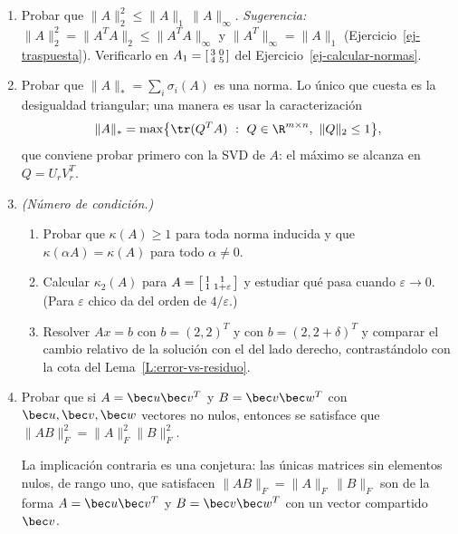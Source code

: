 \begin{enumerate}
\item\label{ej-2-1-infty} Probar que $\|A\|_2^2\le\|A\|_1\,\|A\|_\infty$.
\emph{Sugerencia:} $\|A\|_2^2=\|A^TA\|_2\le\|A^TA\|_\infty$ y
$\|A^T\|_\infty=\|A\|_1$ (Ejercicio~\ref{ej-traspuesta}). Verificarlo en
$A_1=\begin{bsmallmatrix}3&0\\ 4&5\end{bsmallmatrix}$ del
Ejercicio~\ref{ej-calcular-normas}.

\item\label{ej-nuclear} Probar que $\|A\|_*=\sum_i\sigma_i(A)$ es una norma.
Lo único que cuesta es la desigualdad triangular; una manera es usar la
caracterización
\[
\|A\|_*=\max\bigl\{\tr(Q^TA)\ :\ Q\in\R^{m\times n},\ \|Q\|_2\le1\bigr\} ,
\]
que conviene probar primero con la SVD de $A$: el máximo se alcanza en
$Q=U_rV_r^T$.

\item\label{ej-condicion} \emph{(Número de condición.)}
\begin{enumerate}[label=\textup{(\alph*)}]
\item Probar que $\kappa(A)\ge1$ para toda norma inducida y que
$\kappa(\alpha A)=\kappa(A)$ para todo $\alpha\neq0$.
\item Calcular $\kappa_2(A)$ para
$A=\begin{bsmallmatrix}1&1\\ 1&1+\varepsilon\end{bsmallmatrix}$ y estudiar qué
pasa cuando $\varepsilon\to0$. (Para $\varepsilon$ chico da del orden de
$4/\varepsilon$.)
\item Resolver $Ax=b$ con $b=(2,2)^T$ y con $b=(2,2+\delta)^T$ y comparar el
cambio relativo de la solución con el del lado derecho, contrastándolo con la
cota del Lema~\ref{L:error-vs-residuo}.
\end{enumerate}

\item Probar que si $A = \bec u \bec v^T$ y $B= \bec v \bec w^T$ con
$\bec u,\bec v,\bec w$ vectores no nulos, entonces se satisface que
$\|AB\|_F^2=\|A\|_F^2\|B\|_F^2$.

La implicación contraria es una conjetura: las únicas matrices sin elementos
nulos, de rango uno, que satisfacen $\|AB\|_F=\|A\|_F\,\|B\|_F$ son de la
forma $A=\bec u\bec v^T$ y $B=\bec v\bec w^T$ con un vector compartido
$\bec v$.
\end{enumerate}
